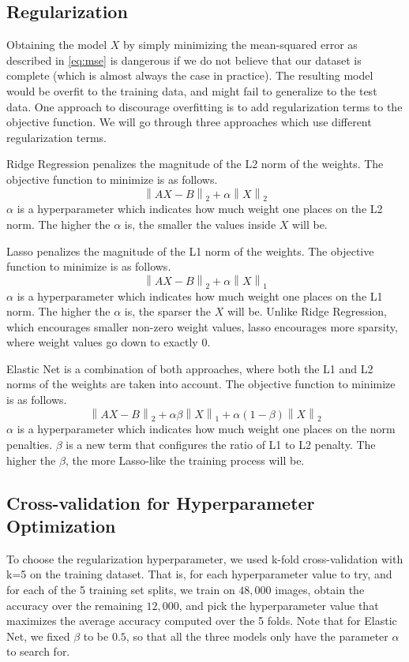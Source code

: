 \documentclass[letterpaper, 10 pt, conference]{ieeeconf}  %
\newcommand{\norm}[1]{\left\lVert#1\right\rVert}
\begin{document}
\subsection{Regularization}
\label{section:bg-regularization}
Obtaining the model $X$ by simply minimizing the mean-squared error as described in \ref{eq:mse} is dangerous if we do not believe that our dataset is complete (which is almost always the case in practice). The resulting model would be overfit to the training data, and might fail to generalize to the test data. One approach to discourage overfitting is to add regularization terms to the objective function. We will go through three approaches which use different regularization terms.

Ridge Regression\cite{hoerl1970ridge} penalizes the magnitude of the L2 norm of the weights. The objective function to minimize is as follows.
\begin{equation}
\norm{AX - B}_2 + \alpha \norm{X}_2
\label{eq:ridge}
\end{equation}
$\alpha$ is a hyperparameter which indicates how much weight one places on the L2 norm. The higher the $\alpha$ is, the smaller the values inside $X$ will be. 

Lasso\cite{tibshirani1994lasso} penalizes the magnitude of the L1 norm of the weights. The objective function to minimize is as follows.
\begin{equation}
\norm{AX - B}_2 + \alpha \norm{X}_1
\label{eq:lasso}
\end{equation}
$\alpha$ is a hyperparameter which indicates how much weight one places on the L1 norm. The higher the $\alpha$ is, the sparser the $X$ will be. Unlike Ridge Regression, which encourages smaller non-zero weight values, lasso encourages more sparsity, where weight values go down to exactly 0.

Elastic Net\cite{zou2005elasticnet} is a combination of both approaches, where both the L1 and L2 norms of the weights are taken into account. The objective function to minimize is as follows.
\begin{equation}
\norm{AX - B}_2 + \alpha \beta \norm{X}_1 + \alpha (1 - \beta)\norm{X}_2
\label{eq:lasso}
\end{equation}
$\alpha$ is a hyperparameter which indicates how much weight one places on the norm penalties. $\beta$ is a new term that configures the ratio of L1 to L2 penalty. The higher the $\beta$, the more Lasso-like the training process will be.

\subsection{Cross-validation for Hyperparameter Optimization}
\label{section:bg-cv}
To choose the regularization hyperparameter, we used k-fold cross-validation with k=5 on the training dataset. That is, for each hyperparameter value to try, and for each of the 5 training set splits, we train on $48,000$ images, obtain the accuracy over the remaining $12,000$, and pick the hyperparameter value that maximizes the average accuracy computed over the 5 folds. Note that for Elastic Net, we fixed $\beta$ to be $0.5$, so that all the three models only have the parameter $\alpha$ to search for. 
\end{document}
